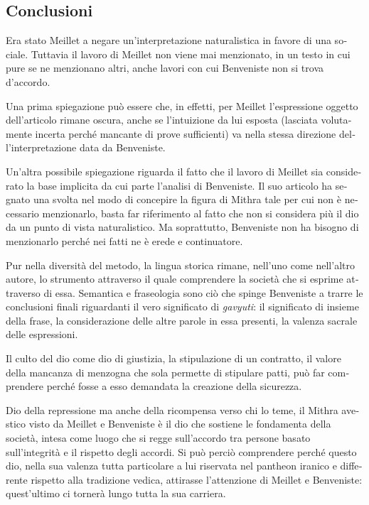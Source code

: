 \documentclass[french,output=paper,colorlinks,citecolor=brown]{../langscibook}
\begin{document}
\begin{otherlanguage}{italian}
\section{Conclusioni}

Era stato Meillet a negare un’interpretazione naturalistica in favore di una sociale. Tuttavia il lavoro di Meillet non viene mai menzionato, in un testo in cui pure se ne menzionano altri, anche lavori con cui Benveniste non si trova d’accordo.

Una prima spiegazione può essere che, in effetti, per Meillet l’espressione oggetto dell’articolo rimane oscura, anche se l’intuizione da lui esposta (lasciata volutamente incerta perché mancante di prove sufficienti) va nella stessa direzione dell’interpretazione data da Benveniste.

Un’altra possibile spiegazione riguarda il fatto che il lavoro di Meillet sia considerato la base implicita da cui parte l’analisi di Benveniste. Il suo articolo ha segnato una svolta nel modo di concepire la figura di Mithra tale per cui non è necessario menzionarlo, basta far riferimento al fatto che non si considera più il dio da un punto di vista naturalistico. Ma soprattutto, Benveniste non ha bisogno di menzionarlo perché nei fatti ne è erede e continuatore.

Pur nella diversità del metodo, la lingua storica rimane, nell’uno come nell’altro autore, lo strumento attraverso il quale comprendere la società che si esprime attraverso di essa. Semantica e fraseologia sono ciò che spinge Benveniste a trarre le conclusioni finali riguardanti il vero significato di \textit{gavyuti}: il significato di insieme della frase, la considerazione delle altre parole in essa presenti, la valenza sacrale delle espressioni.

Il culto del dio come dio di giustizia, la stipulazione di un contratto, il valore della mancanza di menzogna che sola permette di stipulare patti, può far comprendere perché fosse a esso demandata la creazione della sicurezza.

Dio della repressione ma anche della ricompensa verso chi lo teme, il Mithra avestico visto da Meillet e Benveniste è il dio che sostiene le fondamenta della società, intesa come luogo che si regge sull’accordo tra persone basato sull’integrità e il rispetto degli accordi. Si può perciò comprendere perché questo dio, nella sua valenza tutta particolare a lui riservata nel pantheon iranico e differente rispetto alla tradizione vedica, attirasse l’attenzione di Meillet e Benveniste: quest’ultimo ci tornerà lungo tutta la sua carriera.


\end{otherlanguage}
\end{document}
